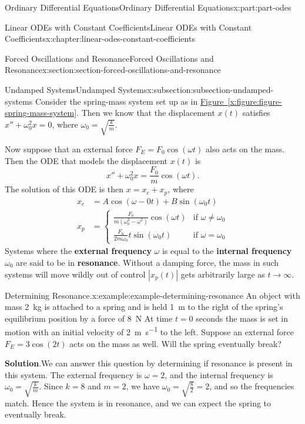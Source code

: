 \documentclass[oneside,10pt,]{book}
\newcommand{\blocktitlefont}{\relax}
\newcommand{\xreffont}{\relax}
\newcommand{\terminology}[1]{\textbf{#1}}
\numberwithin{equation}{part}
\newcommand{\amp}{&}
\begin{document}
\begin{partptx}{Ordinary Differential Equations}{}{Ordinary Differential Equations}{}{}{x:part:part-odes}
\begin{chapterptx}{Linear ODEs with Constant Coefficients}{}{Linear ODEs with Constant Coefficients}{}{}{x:chapter:linear-odes-constant-coefficients}
\begin{sectionptx}{Forced Oscillations and Resonance}{}{Forced Oscillations and Resonance}{}{}{x:section:section-forced-oscillations-and-resonance}
\begin{subsectionptx}{Undamped Systems}{}{Undamped Systems}{}{}{x:subsection:subsection-undamped-systems}
Consider the spring-mass system set up as in \hyperref[x:figure:figure-spring-mass-system]{Figure~{\xreffont\ref{x:figure:figure-spring-mass-system}}}. Then we know that the displacement \(x(t)\) satisfies \(x'' + \omega_{0}^{2}x = 0\), where \(\omega_{0} = \sqrt{\frac{k}{m}}\).%
\par
Now suppose that an external force \(F_{E} = F_{0}\cos(\omega t)\) also acts on the mass. Then the ODE that models the displacement \(x(t)\) is%
\begin{equation*}
x'' + \omega_{0}^{2}x = \frac{F_{0}}{m}\cos(\omega t).
\end{equation*}
The solution of this ODE is then \(x = x_{c} + x_{p}\), where%
\begin{align*}
x_{c} \amp= A\cos(\omega-{0}t) + B\sin(\omega_{0}t)\\
x_{p} \amp= \begin{cases} \frac{F_{0}}{m(\omega_{0}^{2} - \omega^{2})} \cos(\omega t) \amp\text{if }\omega\neq\omega_{0} \\ \frac{F_{0}}{2m\omega_{0}} t\sin(\omega_{0} t) \amp\text{if }\omega=\omega_{0} \end{cases}
\end{align*}
Systems where the \terminology{external frequency} \(\omega\) is equal to the \terminology{internal frequency} \(\omega_{0}\) are said to be in \terminology{resonance}. Without a damping force, the mass in such systems will move wildly out of control \(|x_{p}(t)|\) gets arbitrarily large as \(t\to\infty\).%
\begin{example}{Determining Resonance.}{x:example:example-determining-resonance}%
An object with mass \SI{2}{\kilo\gram} is attached to a spring and is held \SI{1}{\meter} to the right of the spring's equilibrium position by a force of \SI{8}{\newton} At time \(t = 0\) seconds the mass is set in motion with an initial velocity of \SI{2}{\meter\per\second} to the left. Suppose an external force \(F_{E} = 3\cos(2t)\) acts on the mass as well. Will the spring eventually break?%
\par\smallskip%
\noindent\textbf{\blocktitlefont Solution}.\hypertarget{g:solution:idp105548779657632}{}\quad{}We can answer this question by determining if resonance is present in this system. The external frequency is \(\omega = 2\), and the internal frequency is \(\omega_{0} = \sqrt{\frac{k}{m}}\). Since \(k = 8\) and \(m = 2\), we have \(\omega_{0} = \sqrt{\frac{8}{2}} = 2\), and so the frequencies match. Hence the system is in resonance, and we can expect the spring to eventually break.%

\end{example}
\end{subsectionptx}
\end{sectionptx}
\end{chapterptx}
\end{partptx}
\end{document}
